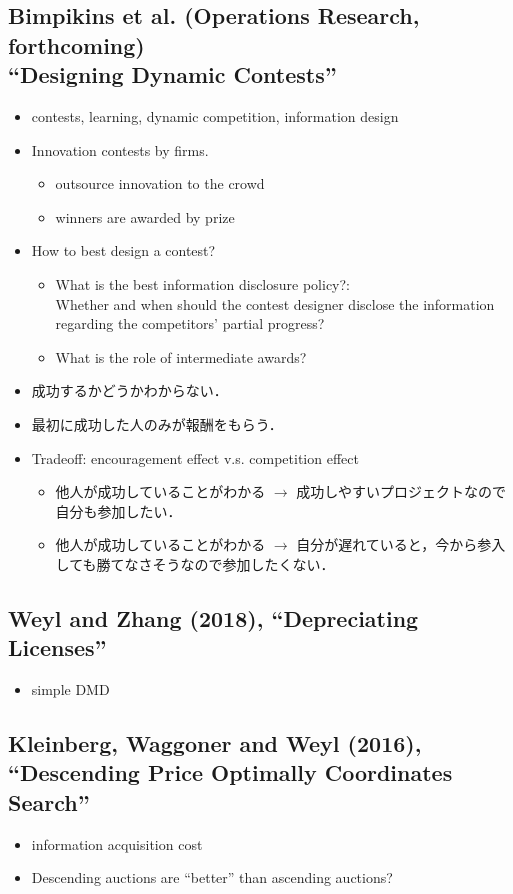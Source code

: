 \documentclass[11pt,a4paper,dvipdfmx]{article}
\newcommand{\1}{\mathbbm{1}}
\begin{document}
\subsection{Bimpikins et al. (Operations Research, forthcoming) \\ ``Designing Dynamic Contests''}

\begin{itemize}
	\item contests, learning, dynamic competition, information design
	\item Innovation contests by firms.
	\begin{itemize}
		\item outsource innovation to the crowd
		\item winners are awarded by prize
	\end{itemize}
	\item How to best design a contest?
	\begin{itemize}
		\item What is the best information disclosure policy?: \\
		Whether and when should the contest designer disclose the information regarding the competitors' partial progress?
		\item What is the role of intermediate awards?
	\end{itemize}
	\item 成功するかどうかわからない．
	\item 最初に成功した人のみが報酬をもらう．
	\item Tradeoff: encouragement effect v.s. competition effect
	\begin{itemize}
		\item 他人が成功していることがわかる $\rightarrow$ 成功しやすいプロジェクトなので自分も参加したい．
		\item 他人が成功していることがわかる $\rightarrow$ 自分が遅れていると，今から参入しても勝てなさそうなので参加したくない．
	\end{itemize}
\end{itemize}

\subsection{Weyl and Zhang (2018), ``Depreciating Licenses''}
\begin{itemize}
	\item simple DMD
\end{itemize}

\subsection{Kleinberg, Waggoner and Weyl (2016), ``Descending Price Optimally Coordinates Search''}
\begin{itemize}
	\item information acquisition cost
	\item Descending auctions are ``better'' than ascending auctions? 
\end{itemize}
\end{document}
